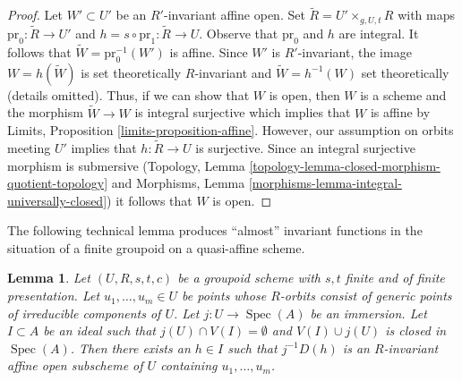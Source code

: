 \documentclass[10pt,a4paper]{amsart}
\theoremstyle{plain}
\newtheorem{lemma}[subsection]{Lemma}
\theoremstyle{definition}
\theoremstyle{remark}
\numberwithin{equation}{subsection}
\def\Spec{\mathop{\mathrm{Spec}}}
\begin{document}
\begin{proof}
Let $W' \subset U'$ be an $R'$-invariant affine open.
Set $\tilde R = U' \times_{g, U, t} R$ with maps
$\text{pr}_0 : \tilde R \to U'$ and $h = s \circ \text{pr}_1 : \tilde R \to U$.
Observe that $\text{pr}_0$ and $h$ are integral.
It follows that $\tilde W = \text{pr}_0^{-1}(W')$ is affine.
Since $W'$ is $R'$-invariant, the image
$W = h(\tilde W)$ is set theoretically $R$-invariant and
$\tilde W = h^{-1}(W)$ set theoretically (details omitted).
Thus, if we can show that $W$ is open, then $W$ is a scheme
and the morphism $\tilde W \to W$ is integral surjective
which implies that $W$ is affine by
Limits, Proposition \ref{limits-proposition-affine}.
However, our assumption on orbits meeting $U'$ implies
that $h : \tilde R \to U$ is surjective. Since an
integral surjective morphism is submersive
(Topology, Lemma \ref{topology-lemma-closed-morphism-quotient-topology}
and Morphisms, Lemma \ref{morphisms-lemma-integral-universally-closed})
it follows that $W$ is open.
\end{proof}

\noindent
The following technical lemma produces ``almost'' invariant
functions in the situation of a finite groupoid on a quasi-affine
scheme.

\begin{lemma}
\label{lemma-find-almost-invariant-function}
Let $(U, R, s, t, c)$ be a groupoid scheme with $s, t$ finite and of
finite presentation. Let $u_1, \ldots, u_m \in U$ be points whose $R$-orbits
consist of generic points of irreducible components of $U$.
Let $j : U \to \Spec(A)$ be an immersion.
Let $I \subset A$ be an ideal such that $j(U) \cap V(I) = \emptyset$
and $V(I) \cup j(U)$ is closed in $\Spec(A)$.
Then there exists an $h \in I$ such that $j^{-1}D(h)$
is an $R$-invariant affine open subscheme of $U$ containing
$u_1, \ldots, u_m$.
\end{lemma}
\end{document}
